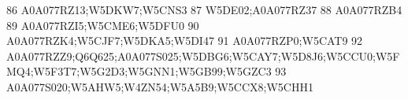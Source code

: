 \documentclass{beamer}
\begin{document}
\begin{frame}[fragile]
\begin{itemize}
\begin{Schunk}
\begin{Soutput}
86                                                                                                                                                                                                                                                                                                                                                       A0A077RZ13;W5DKW7;W5CNS3
87                                                                                                                                                                                                                                                                                                                                                              W5DE02;A0A077RZ37
88                                                                                                                                                                                                                                                                                                                                                                     A0A077RZB4
89                                                                                                                                                                                                                                                                                                                                                       A0A077RZI5;W5CME6;W5DFU0
90                                                                                                                                                                                                                                                                                                                                                A0A077RZK4;W5CJF7;W5DKA5;W5DI47
91                                                                                                                                                                                                                                                                                                                                                              A0A077RZP0;W5CAT9
92                                                                                                                                                                                                                                                                             A0A077RZZ9;Q6Q625;A0A077S025;W5DBG6;W5CAY7;W5D8J6;W5CCU0;W5FMQ4;W5F3T7;W5G2D3;W5GNN1;W5GB99;W5GZC3
93                                                                                                                                                                                                                                                                                                                                  A0A077S020;W5AHW5;W4ZN54;W5A5B9;W5CCX8;W5CHH1

\end{Soutput}
\end{Schunk}
\end{itemize}
\end{frame}
\end{document}

